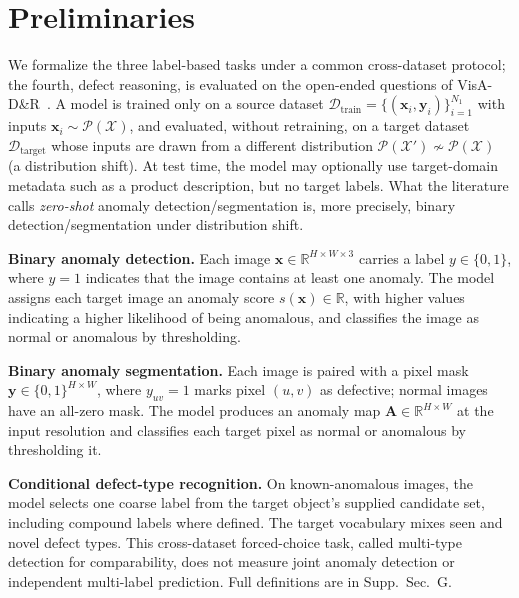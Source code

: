 \section{Preliminaries}
\label{sec:prelims}
We formalize the three label-based tasks under a common cross-dataset protocol; the fourth, defect reasoning, is evaluated on the open-ended questions of VisA-D\&R~\cite{xu2025towards}. A model is trained only on a source dataset $\mathcal{D}_{\text{train}}=\{(\boldsymbol{x}_i,\boldsymbol{y}_i)\}_{i=1}^{N_1}$ with inputs $\boldsymbol{x}_i\sim\mathcal{P}(\mathcal{X})$, and evaluated, without retraining, on a target dataset $\mathcal{D}_{\text{target}}$ whose inputs are drawn from a different distribution $\mathcal{P}(\mathcal{X}')\nsim\mathcal{P}(\mathcal{X})$ (a distribution shift). At test time, the model may optionally use target-domain metadata such as a product description, but no target labels. What the literature calls \emph{zero-shot} anomaly detection/segmentation is, more precisely, binary detection/segmentation under distribution shift.

\smallskip\noindent\textbf{Binary anomaly detection.} Each image $\boldsymbol{x}\in\mathbb{R}^{H\times W\times 3}$ carries a label $y\in\{0,1\}$, where $y=1$ indicates that the image contains at least one anomaly. The model assigns each target image an anomaly score $s(\boldsymbol{x})\in\mathbb{R}$, with higher values indicating a higher likelihood of being anomalous, and classifies the image as normal or anomalous by thresholding.

\smallskip\noindent\textbf{Binary anomaly segmentation.} Each image is paired with a pixel mask $\boldsymbol{y}\in\{0,1\}^{H\times W}$, where $y_{uv}=1$ marks pixel $(u,v)$ as defective; normal images have an all-zero mask. The model produces an anomaly map $\mathbf{A}\in\mathbb{R}^{H\times W}$ at the input resolution and classifies each target pixel as normal or anomalous by thresholding it. 

\smallskip\noindent\textbf{Conditional defect-type recognition.} On known-anomalous images, the model selects one coarse label from the target object's supplied candidate set, including compound labels where defined. The target vocabulary mixes seen and novel defect types. This cross-dataset forced-choice task, called multi-type detection for comparability, does not measure joint anomaly detection or independent multi-label prediction. Full definitions are in Supp.~Sec.~G.
